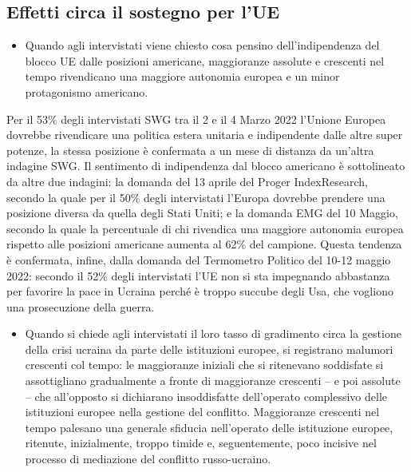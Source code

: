 \documentclass[
]{book}
\providecommand{\tightlist}{%
  \setlength{\itemsep}{0pt}\setlength{\parskip}{0pt}}
\begin{document}
\hypertarget{effetti-circa-il-sostegno-per-lue}{%
\subsection{Effetti circa il sostegno per l'UE}\label{effetti-circa-il-sostegno-per-lue}}

\begin{itemize}
\tightlist
\item
  Quando agli intervistati viene chiesto cosa pensino dell'indipendenza del blocco UE dalle posizioni americane, maggioranze assolute e crescenti nel tempo rivendicano una maggiore autonomia europea e un minor protagonismo americano.
\end{itemize}

Per il 53\% degli intervistati SWG tra il 2 e il 4 Marzo 2022 l'Unione Europea dovrebbe rivendicare una politica estera unitaria e indipendente dalle altre super potenze, la stessa posizione è confermata a un mese di distanza da un'altra indagine SWG. Il sentimento di indipendenza dal blocco americano è sottolineato da altre due indagini: la domanda del 13 aprile del Proger IndexResearch, secondo la quale per il 50\% degli intervistati l'Europa dovrebbe prendere una posizione diversa da quella degli Stati Uniti; e la domanda EMG del 10 Maggio, secondo la quale la percentuale di chi rivendica una maggiore autonomia europea rispetto alle posizioni americane aumenta al 62\% del campione.
Questa tendenza è confermata, infine, dalla domanda del Termometro Politico del 10-12 maggio 2022: secondo il 52\% degli intervistati l'UE non si sta impegnando abbastanza per favorire la pace in Ucraina perché è troppo succube degli Usa, che vogliono una prosecuzione della guerra.

\begin{itemize}
\tightlist
\item
  Quando si chiede agli intervistati il loro tasso di gradimento circa la gestione della crisi ucraina da parte delle istituzioni europee, si registrano malumori crescenti col tempo: le maggioranze iniziali che si ritenevano soddisfate si assottigliano gradualmente a fronte di maggioranze crescenti -- e poi assolute -- che all'opposto si dichiarano insoddisfatte dell'operato complessivo delle istituzioni europee nella gestione del conflitto.
  Maggioranze crescenti nel tempo palesano una generale sfiducia nell'operato delle istituzione europee, ritenute, inizialmente, troppo timide e, seguentemente, poco incisive nel processo di mediazione del conflitto russo-ucraino.
\end{itemize}
\end{document}

